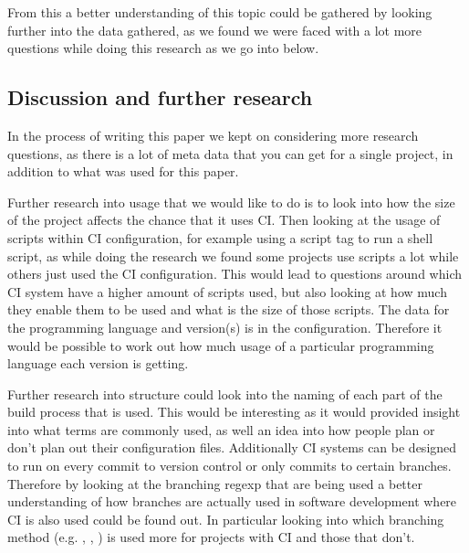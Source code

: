 \documentclass[10pt,conference]{IEEEtran}
\begin{document}
From this a better understanding of this topic could be gathered by looking further into the data gathered, as we found we were faced with a lot more questions while doing this research as we go into below.

\vspace*{-0.05in}
\subsection{Discussion and further research}
\vspace*{-0.05in}
In the process of writing this paper we kept on considering more research questions, as there is a lot of meta data that you can get for a single project, in addition to what was used for this paper.

Further research into usage that we would like to do is to look into how the size of the project affects the chance that it uses CI. Then looking at the usage of scripts within CI configuration, for example using a script tag to run a shell script, as while doing the research we found some projects use scripts a lot while others just used the CI configuration. This would lead to questions around which CI system have a higher amount of scripts used, but also looking at how much they enable them to be used and what is the size of those scripts.
The data for the programming language and version(s) is in the configuration. Therefore it would be possible to work out how much usage of a particular programming language each version is getting.

Further research into structure could look into the naming of each part of the build process that is used. This would be interesting as it would provided insight into what terms are commonly used, as well an idea into how people plan or don't plan out their configuration files.
Additionally CI systems can be designed to run on every commit to version control or only commits to certain branches. Therefore by looking at the branching regexp that are being used a better understanding of how branches are actually used in software development where CI is also used could be found out. In particular looking into which branching method (e.g. \cite{BranchGITFLOW2010}, \cite{BranchGITHUBFLOW2017}, \cite{BranchTrunk2013}) is used more for projects with CI and those that don't. 


\end{document}
